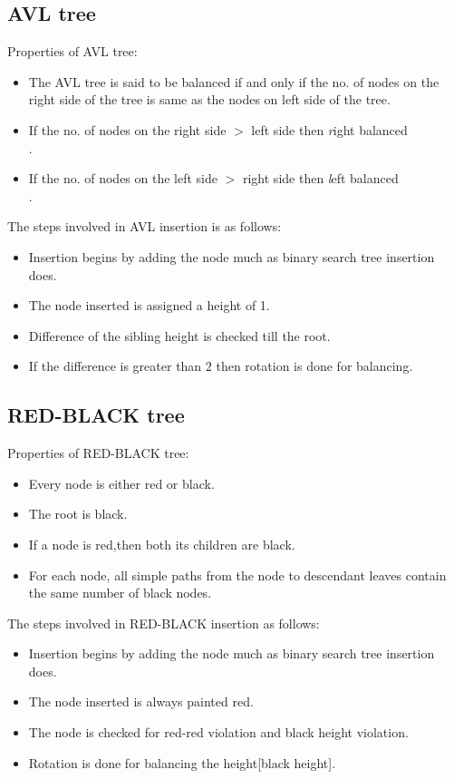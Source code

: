 \documentclass{article}
\begin{document}
\subsection{AVL tree}
Properties of AVL tree:
\begin{itemize}
\item  The AVL tree is said to be balanced if and only if the no. of nodes on the right side of the tree is same as the nodes on left side of the tree.
\item  If the no. of nodes on the right side {$>$} left side then \textit right balanced\\.
\item  If the no. of nodes on the left side {$>$} right side then \textit left balanced\\.

\end{itemize}
The steps involved in AVL insertion is as follows:
\begin{itemize}
\item  Insertion begins by adding the node much as binary search tree insertion does.
\item  The node inserted is assigned a height of 1.
\item  Difference of the sibling height is checked till the root.
\item  If the difference is greater than {$2$} then rotation is done for balancing.

\end{itemize}
\subsection{RED-BLACK tree}
Properties of RED-BLACK tree:
\begin{itemize}
\item  Every node is either red or black.
\item  The root is black.
\item  If a node is red,then both its children are black.
\item  For each node, all simple paths from the node to descendant leaves contain the same number of black nodes.

\end{itemize}
The steps involved in RED-BLACK insertion as follows:
\begin{itemize}
\item  Insertion begins by adding the node much as binary search tree insertion does.
\item  The node inserted is always painted red.
\item  The node is checked for red-red violation and black height violation.
\item  Rotation is done for balancing the height[black height].
\end{itemize}
\newpage
\end{document}
